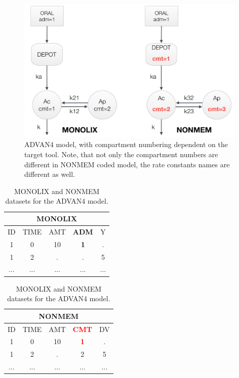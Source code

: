 \begin{figure}[htbp!]
\centering
 \includegraphics[width=110mm]{pics/Advan4}
\caption{ADVAN4 model, with compartment numbering dependent on the target tool. 
Note, that not only the compartment numbers are different in NONMEM coded model, 
the rate constants names are different as well.}
\label{fig:Advan4}
\end{figure}


\begin{table}[ht!]
\footnotesize
\parbox{.5\linewidth}{
\centering
\begin{tabular}{ccccc}
  \hline
   \multicolumn{5}{c}{\textbf{MONOLIX}} \\
  \hline
ID & TIME & AMT & \textbf{ADM} & Y \\
  \hline
1  & 0        & 10   & \textbf{1} & .       \\
1  & 2        & .      & . & 5        \\
... &  ...      &  ...   &  ...&  ...     \\
\end{tabular}
}
\hfill
\parbox{.5\linewidth}{
\centering
\begin{tabular}{ccccc}
  \hline
   \multicolumn{5}{c}{\textbf{NONMEM}} \\
  \hline
ID & TIME & AMT & \textbf{\textcolor{red}{CMT}} & DV \\
  \hline
1  & 0        & 10   & \textbf{\textcolor{red}{1}}   & .    \\
1  & 2        & .      & 2    & 5   \\
... &  ...      &  ...   &  ... & ...  \\
\end{tabular}
}
\caption{MONOLIX and NONMEM datasets for the ADVAN4 model.}
\end{table}


